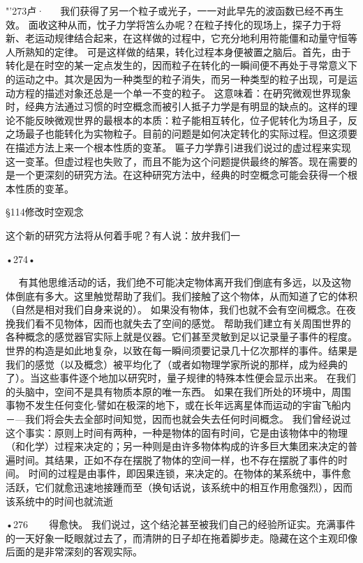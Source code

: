 "'273卢·
  
我们获得了另一个粒子或光子，一一对此早先的波函数已经不再生效。
面收这种从而，忱子力学将笘么办呢？在粒子抟化的现场上，探子力于将新、老运动规律结合起来，在这样做的过程中，它充分地利用符能僵和动量守恒等人所熟知的定律。
可是这样做的结果，转化过程本身便被置之脑后。首先，由于转化是在时空的某一定点发生的，因而粒子在转化的一瞬间便不再处于寻常意义下的运动之中。其次是因为一种类型的粒子消失，而另一种类型的粒子出现，可是运动方程的描述对象还总是一个单一不变的粒子。
这意味着：在砃究微观世界现象时，经典方法通过习惯的时空概念而被引人抵子力学是有明显的缺点的。这样的理论不能反映微观世界的最根本的本质：粒子能相互转化，位子伲转化为场且子，反之场最子也能转化为实物粒子。目前的问题是如何决定转化的实际过程。但这须要在描述方法上来一个根本性质的变革。
匾子力学靠引进我们说过的虚过程来实现这一变革。但虚过程也失败了，而且不能为这个问题提供最终的解答。现在需要的是一个更深刻的研究方法。在这种研究方法中，经典的时空概念可能会获得一个根本性质的变革。

§114修改时空观念

这个新的研究方法将从何着手呢？有人说：放弁我们一

•274•
  




  
有其他思维活动的话，我们绝不可能决定物体离开我们倒底有多远，以及这物体倒底有多大。这里触觉帮助了我们。我们接触了这个物体，从而知道了它的体积（自然是相对我们自身来说的）。
如果没有物体，我们也就不会有空间概念。在夜挽我们看不见物体，因而也就失去了空间的感觉。
帮助我们建立有关周围世界的各种概念的感觉器官实际上就是仪器。它们甚至灵敏到足以记录量子事件的程度。世界的构造是如此地复杂，以致在每一瞬间须要记录几十亿次那样的事件。结果是我们的感觉（以及概念）被平均化了（或者如物理学家所说的那样，成为经典的了）。当这些事件逐个地加以研究时，量子规律的特殊本性便会显示出来。
在我们的头脑中，空间不是具有物质本原的唯一东西。
如果在我们所处的环境中，周围事物不发生任何变化-譬如在极深的地下，或在长年远离星体而运动的宇宙飞船内－—我们将会失去全部时间知觉，因而也就会失去任何时间概念。
我们曾经说过这个事实：原则上时间有两种，一种是物体的固有时间，它是由该物体中的物理（和化学）过程来决定的；另一种则是由许多物体构成的许多巨大集团来决定的普遍时间。其结果，正如不存在摆脱了物体的空间一样，也不存在摆脱了事件的时间。
时间的过程是由事件，即因果连锁，来决定的。在物体的某系统中，事件愈活跃，它们就愈迅速地接踵而至（换旬话说，该系统中的相互作用愈强烈），因而该系统中的时间也就流逝

•276~
  
得愈快。
我们说过，这个结沦甚至被我们自己的经验所证实。充满事件的一天好象一眨眼就过去了，而清阱的日子却在拖着脚步走。隐藏在这个主观印像后面的是非常深刻的客观实际。

